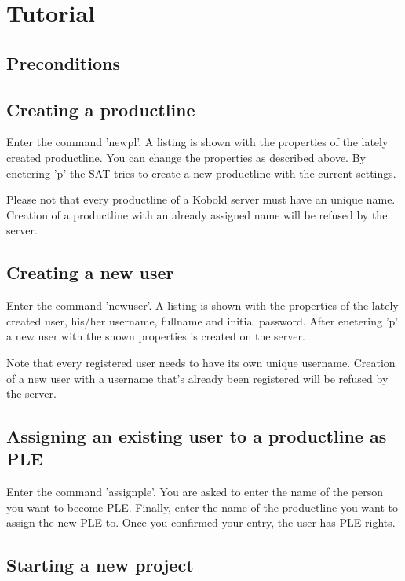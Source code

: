 \chapter{Tutorial}

\section{Preconditions}




\section{Creating a productline}
Enter the command 'newpl'. A listing is shown with the properties of the lately created
productline. You can change the properties as described above. By enetering 'p' the SAT
tries to create a new productline with the current settings. \par

Please not that every productline of a Kobold server must have an unique name. Creation
of a productline with an already assigned name will be refused by the server.



\section{Creating a new user}
Enter the command 'newuser'. A listing is shown with the properties of the lately created
user, his/her username, fullname and initial password. After enetering 'p' a new user with
the shown properties is created on the server.\par

Note that every registered user needs to have its own unique username. Creation of a new user 
with a username that's already been registered will be refused by the server.



\section{Assigning an existing user to a productline as PLE}
Enter the command 'assignple'. You are asked to enter the name of the person you want
to become PLE. Finally, enter the name of the productline you want to assign the new 
PLE to. Once you confirmed your entry, the user has PLE rights.


\section{Starting a new project}

